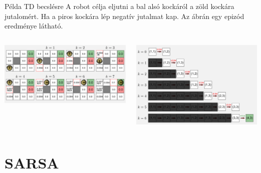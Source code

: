 \documentclass[english, aspectratio=169]{beamer}
\makeatletter
\let\origtableofcontents=\tableofcontents
\def\tableofcontents{\@ifnextchar[{\origtableofcontents}{\gobbletableofcontents}}
\def\gobbletableofcontents#1{\origtableofcontents}
\makeatother
\begin{document}
\begin{frame}{Példa TD becslésre}
A robot célja eljutni a bal alsó kockáról a zöld kockára jutalomért. Ha a piros kockára lép negatív jutalmat kap. Az ábrán egy epizód eredménye látható.
\begin{columns}
\begin{column}{.5\textwidth}
\begin{center}
\includegraphics[width=7cm, keepaspectratio]{images/mc_td_17.png}
\end{center}
\end{column}
\begin{column}{.5\textwidth}
\begin{center}
\includegraphics[width=7cm, keepaspectratio]{images/mc_td_18.png}
\end{center}
\end{column}
\end{columns}
\end{frame}

\section{SARSA}

\begin{frame}
\tableofcontents[currentsection]
\end{frame}
\end{document}
